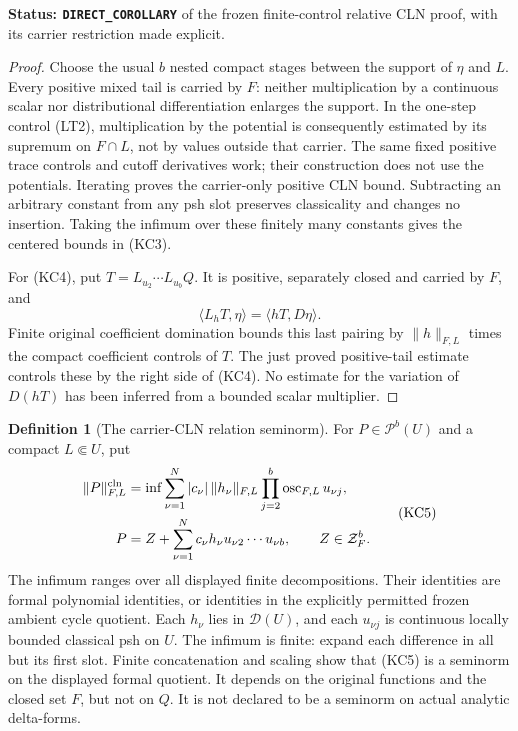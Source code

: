 \documentclass[11pt,a4paper]{article}
\numberwithin{equation}{section}
\theoremstyle{definition}
\newtheorem{definition}[theorem]{Definition}
\theoremstyle{remark}
\begin{document}
\noindent\textbf{Status: \texttt{DIRECT\_COROLLARY}} of the
frozen finite-control relative CLN proof, with its carrier
restriction made explicit.

\begin{proof}
Choose the usual \(b\) nested compact stages between the support
of \(\eta\) and \(L\). Every positive mixed tail is carried by
\(F\): neither multiplication by a continuous scalar nor
distributional differentiation enlarges the support.
In the one-step control (LT2), multiplication by the potential
is consequently estimated by its supremum on \(F\cap L\), not
by values outside that carrier. The same fixed positive trace
controls and cutoff derivatives work; their construction does
not use the potentials. Iterating proves the carrier-only
positive CLN bound. Subtracting an arbitrary constant from any
psh slot preserves classicality and changes no insertion.
Taking the infimum over these finitely many constants gives the
centered bounds in (KC3).

For (KC4), put \(T=L_{u_2}\cdots L_{u_b}Q\). It is positive,
separately closed and carried by \(F\), and
\[
               \langle L_hT,\eta\rangle=\langle hT,D\eta\rangle.
\]
Finite original coefficient domination bounds this last pairing
by \(\|h\|_{F,L}\) times the compact coefficient controls of \(T\).
The just proved positive-tail estimate controls these by the
right side of (KC4). No estimate for the variation of \(D(hT)\)
has been inferred from a bounded scalar multiplier.
\end{proof}

\begin{definition}[The carrier-CLN relation seminorm]
\label{def:r12-carrier-cln-seminorm}
For \(P\in\mathcal P^b(U)\) and a compact \(L\Subset U\), put
\[
 \begin{aligned}
 \|P\|^{\rm cln}_{F,L}
  &=\inf
       \sum_{\nu=1}^N |c_\nu|\,\|h_\nu\|_{F,L}
                  \prod_{j=2}^b\operatorname{osc}_{F,L}u_{\nu j},\\
 P&=Z+\sum_{\nu=1}^N c_\nu h_\nu u_{\nu2}\cdots u_{\nu b},
             \qquad Z\in\mathcal Z_F^b .
 \end{aligned}
 \tag{KC5}
\]
The infimum ranges over all displayed finite decompositions.
Their identities are formal polynomial identities,
or identities in the explicitly permitted frozen ambient cycle
quotient. Each \(h_\nu\) lies in \(\mathcal D(U)\), and each
\(u_{\nu j}\) is continuous locally bounded classical psh on \(U\).
The infimum is finite: expand each difference in all but its
first slot. Finite concatenation and scaling show that (KC5)
is a seminorm on the displayed formal quotient. It depends on
the original functions and the closed set \(F\), but not on \(Q\).
It is not declared to be a seminorm on actual analytic delta-forms.
\end{definition}
\end{document}
